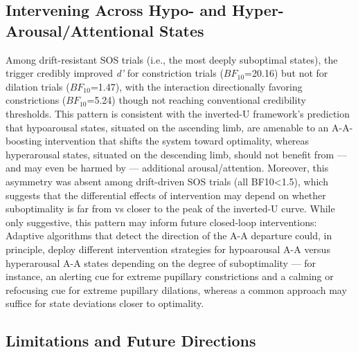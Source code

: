 \subsection{Intervening Across Hypo- and Hyper- Arousal/Attentional States}

Among drift-resistant SOS trials (i.e., the most deeply suboptimal states), the trigger credibly improved \textit{d'} for constriction trials ($BF_{10}$=20.16) but not for dilation trials ($BF_{10}$=1.47), with the interaction directionally favoring constrictions ($BF_{10}$=5.24) though not reaching conventional credibility thresholds. This pattern is consistent with the inverted-U framework's prediction that hypoarousal states, situated on the ascending limb, are amenable to an A-A-boosting intervention that shifts the system toward optimality, whereas hyperarousal states, situated on the descending limb, should not benefit from — and may even be harmed by — additional arousal/attention. Moreover, this asymmetry was absent among drift-driven SOS trials (all BF10<1.5), which suggests that the differential effects of intervention may depend on whether suboptimality is far from vs closer to the peak of the inverted-U curve. While only suggestive, this pattern may inform future closed-loop interventions: Adaptive algorithms that detect the direction of the A-A departure could, in principle, deploy different intervention strategies for hypoarousal A-A versus hyperarousal A-A states depending on the degree of suboptimality — for instance, an alerting cue for extreme pupillary constrictions and a calming or refocusing cue for extreme pupillary dilations, whereas a common approach may suffice for state deviations closer to optimality.

\subsection{Limitations and Future Directions}

